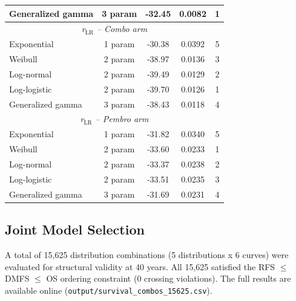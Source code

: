 \documentclass[11pt,a4paper]{article}
\begin{document}
\begin{table}[H]
\begin{tabular}{lcccc}
Generalized gamma & 3 param & -32.45 & 0.0082 & 1 \\
\midrule
\multicolumn{5}{c}{\textit{r$_{\text{LR}}$ -- Combo arm}} \\
Exponential & 1 param & -30.38 & 0.0392 & 5 \\
Weibull & 2 param & -38.97 & 0.0136 & 3 \\
Log-normal & 2 param & -39.49 & 0.0129 & 2 \\
Log-logistic & 2 param & -39.70 & 0.0126 & 1 \\
Generalized gamma & 3 param & -38.43 & 0.0118 & 4 \\
\midrule
\multicolumn{5}{c}{\textit{r$_{\text{LR}}$ -- Pembro arm}} \\
Exponential & 1 param & -31.82 & 0.0340 & 5 \\
Weibull & 2 param & -33.60 & 0.0233 & 1 \\
Log-normal & 2 param & -33.37 & 0.0238 & 2 \\
Log-logistic & 2 param & -33.51 & 0.0235 & 3 \\
Generalized gamma & 3 param & -31.69 & 0.0231 & 4 \\
\bottomrule
\end{tabular}
\end{table}

\subsection{Joint Model Selection}
\label{sec:joint}
A total of 15,625 distribution combinations (5 distributions x 6 curves) were evaluated for structural validity at 40 years. All 15,625 satisfied the RFS $\leq$ DMFS $\leq$ OS ordering constraint (0 crossing violations). The full results are available online (\texttt{output/survival\_combos\_15625.csv}).
\end{document}
